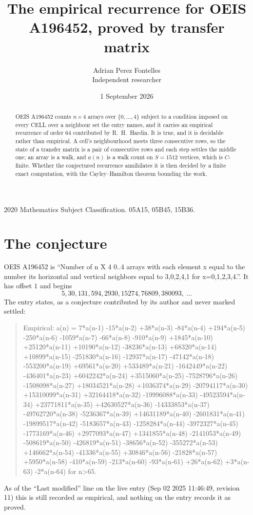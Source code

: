 \documentclass[11pt,a4paper]{article}
\title{The empirical recurrence for OEIS A196452, proved by transfer matrix}
\author{Adrian Perez Fontelles\\ \small Independent researcher}
\date{1 September 2026}
\theoremstyle{plain}
\theoremstyle{definition}
\begin{document}
\maketitle

\begin{abstract}
OEIS A196452 counts $n\times4$ arrays over $\{0,\dots,4\}$ subject to a condition imposed on
every CELL over a neighbour set the entry names, and it carries an empirical recurrence of
order $64$ contributed by R.~H.~Hardin. It is true, and it is decidable rather than
empirical. A cell's neighbourhood meets three consecutive rows, so the state of a transfer
matrix is a pair of consecutive rows and each step settles the middle one; an array is a
walk, and $a(n)$ is a walk count on $S=1512$ vertices, which is $C$-finite. Whether the
conjectured recurrence annihilates it is then decided by a finite exact computation, with the
Cayley--Hamilton theorem bounding the work.
\end{abstract}

\noindent\small 2020 Mathematics Subject Classification. 05A15, 05B45, 15B36.\normalsize

\section{The conjecture}

OEIS A196452 is ``Number of n X 4 0..4 arrays with each element x equal to the number its horizontal and vertical neighbors equal to 3,0,2,4,1 for x=0,1,2,3,4.''. It has offset $1$ and begins
\[
5, 30, 131, 594, 2930, 15274, 76809, 380093,\ \dots
\]
The entry states, as a conjecture contributed by its author and never marked settled:
\begin{quote}
Empirical: a(n) = 7*a(n-1) -15*a(n-2) +38*a(n-3) -84*a(n-4) +194*a(n-5) -250*a(n-6) -1059*a(n-7) -66*a(n-8) -910*a(n-9) +1845*a(n-10) +25120*a(n-11) +10190*a(n-12) -38236*a(n-13) +68320*a(n-14) +10899*a(n-15) -251830*a(n-16) -12937*a(n-17) -47142*a(n-18) -553200*a(n-19) +69561*a(n-20) +533489*a(n-21) -1642449*a(n-22) -436401*a(n-23) +6042242*a(n-24) +3515060*a(n-25) -7528796*a(n-26) -1508098*a(n-27) +18034521*a(n-28) +1036374*a(n-29) -20794117*a(n-30) +15310099*a(n-31) +32164418*a(n-32) -19996088*a(n-33) -49523594*a(n-34) +23771811*a(n-35) +42630527*a(n-36) -14333853*a(n-37) -49762720*a(n-38) -5236367*a(n-39) +14631189*a(n-40) -2601831*a(n-41) -19899517*a(n-42) -5183657*a(n-43) -1258284*a(n-44) -3972327*a(n-45) -1773169*a(n-46) +2977093*a(n-47) +1341855*a(n-48) -2141053*a(n-49) -508619*a(n-50) -426819*a(n-51) -38656*a(n-52) -355272*a(n-53) +146662*a(n-54) -41336*a(n-55) +30846*a(n-56) -21828*a(n-57) +5950*a(n-58) -410*a(n-59) -213*a(n-60) -93*a(n-61) +26*a(n-62) +3*a(n-63) -2*a(n-64) for n>65.
\end{quote}
As of the ``Last modified'' line on the live entry (Sep 02 2025 11:46:49, revision 11) this is still
recorded as empirical, and nothing on the entry records it as proved.
\end{document}
